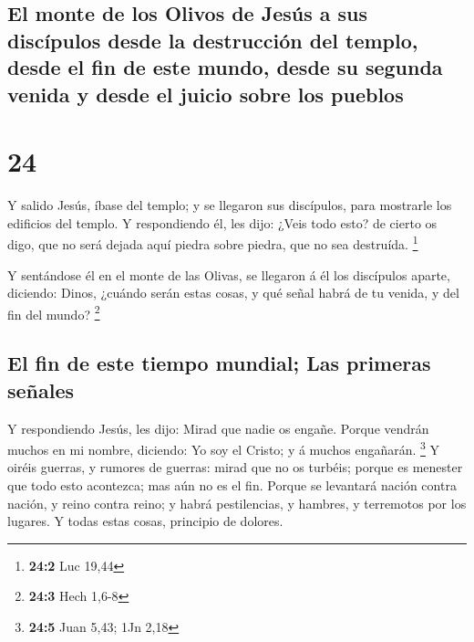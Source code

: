 \hypertarget{el-monte-de-los-olivos-de-jesuxfas-a-sus-discuxedpulos-desde-la-destrucciuxf3n-del-templo-desde-el-fin-de-este-mundo-desde-su-segunda-venida-y-desde-el-juicio-sobre-los-pueblos}{%
\subsection{El monte de los Olivos de Jesús a sus discípulos desde la
destrucción del templo, desde el fin de este mundo, desde su segunda
venida y desde el juicio sobre los
pueblos}\label{el-monte-de-los-olivos-de-jesuxfas-a-sus-discuxedpulos-desde-la-destrucciuxf3n-del-templo-desde-el-fin-de-este-mundo-desde-su-segunda-venida-y-desde-el-juicio-sobre-los-pueblos}}

\hypertarget{section-23}{%
\section{24}\label{section-23}}

 Y salido Jesús, íbase del templo; y se llegaron sus
discípulos, para mostrarle los edificios del templo.  Y
respondiendo él, les dijo: ¿Veis todo esto? de cierto os digo, que no
será dejada aquí piedra sobre piedra, que no sea destruída. \footnote{\textbf{24:2}
  Luc 19,44}

 Y sentándose él en el monte de las Olivas, se llegaron á él
los discípulos aparte, diciendo: Dinos, ¿cuándo serán estas cosas, y qué
señal habrá de tu venida, y del fin del mundo? \footnote{\textbf{24:3}
  Hech 1,6-8}

\hypertarget{el-fin-de-este-tiempo-mundial-las-primeras-seuxf1ales}{%
\subsection{El fin de este tiempo mundial; Las primeras
señales}\label{el-fin-de-este-tiempo-mundial-las-primeras-seuxf1ales}}

 Y respondiendo Jesús, les dijo: Mirad que nadie os engañe.
 Porque vendrán muchos en mi nombre, diciendo: Yo soy el
Cristo; y á muchos engañarán. \footnote{\textbf{24:5} Juan 5,43; 1Jn
  2,18}  Y oiréis guerras, y rumores de guerras: mirad que
no os turbéis; porque es menester que todo esto acontezca; mas aún no es
el fin.  Porque se levantará nación contra nación, y reino
contra reino; y habrá pestilencias, y hambres, y terremotos por los
lugares.  Y todas estas cosas, principio de dolores.

